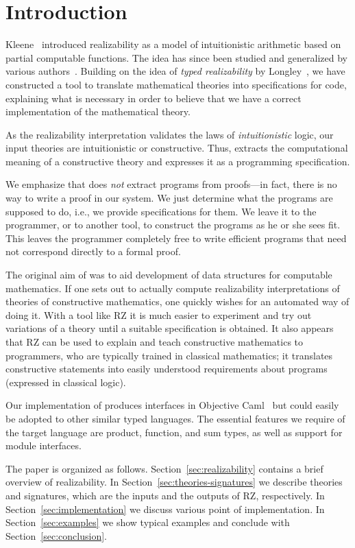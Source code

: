 \section{Introduction}
\label{sec:introduction}

Kleene~\cite{KleeneSC:intint} introduced realizability as a model of
intuitionistic arithmetic based on partial computable functions. The
idea has since been studied and generalized by various
authors~\cite{TroelstraA:rea,HylandJ:efft,HylandJ:trit,OostenJ:exer}.
Building on the idea of \emph{typed realizability} by
Longley~\cite{Longley00}, we have constructed a tool \RZ to
translate mathematical theories into specifications for code,
explaining what is necessary in order to believe that we have a correct
implementation of the mathematical theory.

As the realizability interpretation validates the laws of
\emph{intuitionistic} logic, our input theories are intuitionistic or
constructive. Thus, \RZ extracts the computational
meaning of a constructive theory and expresses it as a programming
specification.

We emphasize that \RZ does \emph{not} extract programs from proofs---in
fact, there is no way to write a proof in our system. We just
determine what the programs are supposed to do, i.e., we provide
specifications for them. We leave it to the programmer, or to another
tool, to construct the programs as he or she sees fit. This leaves
the programmer completely free to write efficient programs
that need not correspond directly to a formal proof.

The original aim of \RZ was to aid development of data structures
for computable mathematics. If one sets out to actually compute
realizability interpretations of theories of constructive mathematics,
one quickly wishes for an automated way of doing it. With a tool like
RZ it is much easier to experiment and try out variations of a theory
until a suitable specification is obtained.  It also appears that
RZ can be used to explain and teach constructive mathematics to
programmers, who are typically trained in classical mathematics; 
it translates constructive statements into easily understood
requirements about programs (expressed in classical logic).

Our implementation of \RZ produces interfaces in Objective
Caml~\cite{ocaml} but could easily be adopted to other similar typed
languages.  The essential features we require of the target language
are product, function, and sum types, as well as support for module
interfaces.

The paper is organized as follows. Section~\ref{sec:realizability}
contains a brief overview of realizability. In
Section~\ref{sec:theories-signatures} we describe theories and
signatures, which are the inputs and the outputs of RZ, respectively. In
Section~\ref{sec:implementation} we discuss various point of
implementation. In Section~\ref{sec:examples} we show typical examples
and conclude with Section~\ref{sec:conclusion}.



